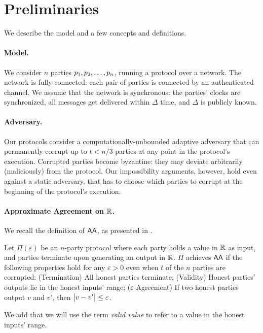 \section{Preliminaries}

We describe the model and a few concepts and definitions.

\paragraph{Model.}
We consider $n$ parties $p_1, p_2, \dots, p_n$, running a protocol over a network. The network is fully-connected: each pair of parties is connected by an authenticated channel.
We assume that the network is synchronous: the parties' clocks are synchronized, all messages get delivered within $\Delta$ time, and $\Delta$ is publicly known. 

\paragraph{Adversary.}
Our protocols consider a computationally-unbounded adaptive adversary that can permanently corrupt up to $t < n / 3$ parties at any point in the protocol's execution. Corrupted parties become byzantine: they may deviate arbitrarily (maliciously) from the protocol. Our impossibility arguments, however, hold even against a static adversary, that has to choose which parties to corrupt at the beginning of the protocol's execution.

\paragraph{Approximate Agreement on $\mathbb{R}$.} We recall the definition of $\textsf{AA}$, as presented in \cite{JACM:DLPSW86}.
\begin{definition} \label{def:aa-real}
Let $\Pi(\varepsilon)$ be an $n$-party protocol where each party holds a value in $\mathbb{R}$ as input, and parties terminate upon generating an output in $\mathbb{R}$. $\Pi$ achieves $\textsf{AA}$ if the following properties hold for any $\varepsilon> 0$ even when $t$ of the $n$ parties are corrupted:
(Termination) All honest parties terminate; (Validity) Honest parties' outputs lie in the honest inputs' range; ($\varepsilon$-Agreement) If two honest parties output $v$ and $v'$, then $\big\lvert v - v'\big\rvert \leq \varepsilon$.
\end{definition}
We add that we will use the term \emph{valid value} to refer to a value in the honest inputs' range.


